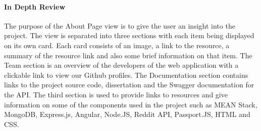 \paragraph{In Depth Review\newline}
The purpose of the About Page view is to give the user an insight into the project. The view is separated into three sections with each item being displayed on its own card. Each card consists of an image, a link to the resource, a summary of the resource link and also some brief information on that item. The Team section is an overview of the developers of the web application with a clickable link to view our Github profiles. The Documentation section contains links to the project source code, dissertation and the Swagger documentation for the API. The third section is used to provide links to resources and give information on some of the components used in the project such as  MEAN Stack, MongoDB, Express.js, Angular, Node.JS, Reddit API, Passport.JS, HTML and CSS.
